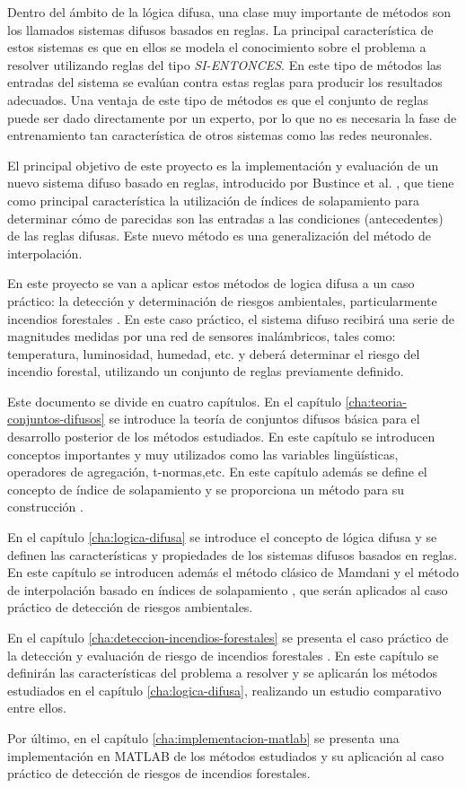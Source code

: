 Dentro del ámbito de la lógica difusa, una clase muy importante de métodos son los llamados sistemas difusos basados en reglas. La principal característica de estos sistemas es que en ellos se modela el conocimiento sobre el problema a resolver utilizando reglas del tipo \emph{SI-ENTONCES}. En este tipo de métodos las entradas del sistema se evalúan contra estas reglas para producir los resultados adecuados. Una ventaja de este tipo de métodos es que el conjunto de reglas puede ser dado directamente por un experto, por lo que no es necesaria la fase de entrenamiento tan característica de otros sistemas como las redes neuronales.

El principal objetivo de este proyecto es la implementación y evaluación de un nuevo sistema difuso basado en reglas, introducido por Bustince et al. \cite{bustince2013overlap}, que tiene como principal característica la utilización de índices de solapamiento para determinar cómo de parecidas son las entradas a las condiciones (antecedentes) de las reglas difusas. Este nuevo método es una generalización del método de interpolación.

En este proyecto se van a aplicar estos métodos de logica difusa a un caso práctico: la detección y determinación de riesgos ambientales, particularmente incendios forestales \cite{bolourchi2013}. En este caso práctico, el sistema difuso recibirá una serie de magnitudes medidas por una red de sensores inalámbricos, tales como: temperatura, luminosidad, humedad, etc. y deberá determinar el riesgo del incendio forestal, utilizando un conjunto de reglas previamente definido.

Este documento se divide en cuatro capítulos. En el capítulo \ref{cha:teoria-conjuntos-difusos} se introduce la teoría de conjuntos difusos básica para el desarrollo posterior de los métodos estudiados. En este capítulo se introducen conceptos importantes y muy utilizados como las variables lingüísticas, operadores de agregación, t-normas,etc. En este capítulo además se define el concepto de índice de solapamiento y se proporciona un método para su construcción \cite{bustince2013overlap}.

En el capítulo \ref{cha:logica-difusa} se introduce el concepto de lógica difusa y se definen las características y propiedades de los sistemas difusos basados en reglas. En este capítulo se introducen además el método clásico de Mamdani \cite{Mamdani1975} y el método de interpolación basado en índices de solapamiento \cite{bustince2013overlap}, que serán aplicados al caso práctico de detección de riesgos ambientales.

En el capítulo \ref{cha:deteccion-incendios-forestales} se presenta el caso práctico de la detección y evaluación de riesgo de incendios forestales \cite{bolourchi2013}. En este capítulo se definirán las características del problema a resolver y se aplicarán los métodos estudiados en el capítulo \ref{cha:logica-difusa}, realizando un estudio comparativo entre ellos.

Por último, en el capítulo \ref{cha:implementacion-matlab} se presenta una implementación en MATLAB de los métodos estudiados y su aplicación al caso práctico de detección de riesgos de incendios forestales.